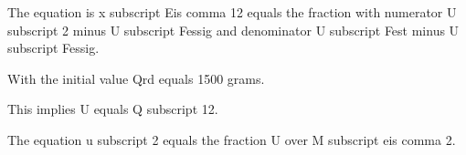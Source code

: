 The equation is x subscript Eis comma 12 equals the fraction with numerator U subscript 2 minus U subscript Fessig and denominator U subscript Fest minus U subscript Fessig.

With the initial value Qrd equals 1500 grams.

This implies U equals Q subscript 12.

The equation u subscript 2 equals the fraction U over M subscript eis comma 2.